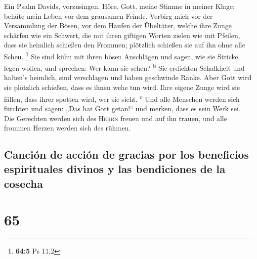  Ein Psalm Davids, vorzusingen.  Höre, Gott,
meine Stimme in meiner Klage; behüte mein Leben vor dem grausamen
Feinde.  Verbirg mich vor der Versammlung der Bösen, vor
dem Haufen der Übeltäter,  welche ihre Zunge schärfen wie
ein Schwert, die mit ihren giftigen Worten zielen wie mit Pfeilen,
 dass sie heimlich schießen den Frommen; plötzlich
schießen sie auf ihn ohne alle Scheu. \footnote{\textbf{64:5} Ps 11,2}
 Sie sind kühn mit ihren bösen Anschlägen und sagen, wie
sie Stricke legen wollen, und sprechen: Wer kann sie sehen?
\textsuperscript{b}  Sie erdichten Schalkheit und halten's
heimlich, sind verschlagen und haben geschwinde Ränke. 
Aber Gott wird sie plötzlich schießen, dass es ihnen wehe tun wird.
 Ihre eigene Zunge wird sie fällen, dass ihrer spotten
wird, wer sie sieht. \textsuperscript{c}  Und alle
Menschen werden sich fürchten und sagen: „Das hat Gott getan!{}`` und
merken, dass es sein Werk sei.  Die Gerechten werden sich
des \textsc{Herrn} freuen und auf ihn trauen, und alle frommen Herzen
werden sich des rühmen.

\hypertarget{canciuxf3n-de-acciuxf3n-de-gracias-por-los-beneficios-espirituales-divinos-y-las-bendiciones-de-la-cosecha}{%
\subsection{Canción de acción de gracias por los beneficios espirituales
divinos y las bendiciones de la
cosecha}\label{canciuxf3n-de-acciuxf3n-de-gracias-por-los-beneficios-espirituales-divinos-y-las-bendiciones-de-la-cosecha}}

\hypertarget{section-64}{%
\section{65}\label{section-64}}

